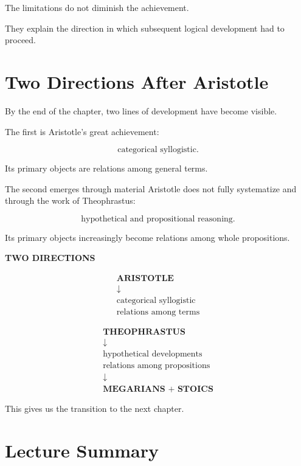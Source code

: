 \documentclass[11pt]{article}
\begin{document}
The limitations do not diminish the achievement.

They explain the direction in which subsequent logical
development had to proceed.

\section{Two Directions After Aristotle}

By the end of the chapter, two lines of development have become
visible.

The first is Aristotle's great achievement:

\[
\text{categorical syllogistic}.
\]

Its primary objects are relations among general terms.

The second emerges through material Aristotle does not fully
systematize and through the work of Theophrastus:

\[
\text{hypothetical and propositional reasoning}.
\]

Its primary objects increasingly become relations among whole
propositions.

\begin{whiteboard}
\textbf{TWO DIRECTIONS}

\[
\begin{array}{c}
\textbf{ARISTOTLE}\\
\downarrow\\
\text{categorical syllogistic}\\
\text{relations among terms}
\end{array}
\]

\[
\begin{array}{c}
\textbf{THEOPHRASTUS}\\
\downarrow\\
\text{hypothetical developments}\\
\text{relations among propositions}\\
\downarrow\\
\textbf{MEGARIANS + STOICS}
\end{array}
\]
\end{whiteboard}

This gives us the transition to the next chapter.

\section{Lecture Summary}
\end{document}
